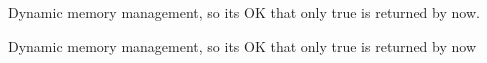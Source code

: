 
\begin{DoxyRefList}
\item[\label{todo__todo000001}%
\hypertarget{todo__todo000001}{}%
global\+Scope$>$ Global \hyperlink{CPU_8h_ac6f43063b3f369af272552de807f94c9}{C\+P\+U\+\_\+construct} (\hyperlink{structCPU}{C\+P\+U} $\ast$\+This)]Dynamic memory management, so its O\+K that only true is returned by now.  
\item[\label{todo__todo000002}%
\hypertarget{todo__todo000002}{}%
global\+Scope$>$ Global \hyperlink{stack_8h_a3f08b3573ad5fad6ef82899a4b6c1f0d}{stack\+\_\+construct} (\hyperlink{structStack}{Stack} $\ast$\+This)]Dynamic memory management, so its O\+K that only true is returned by now 
\end{DoxyRefList}